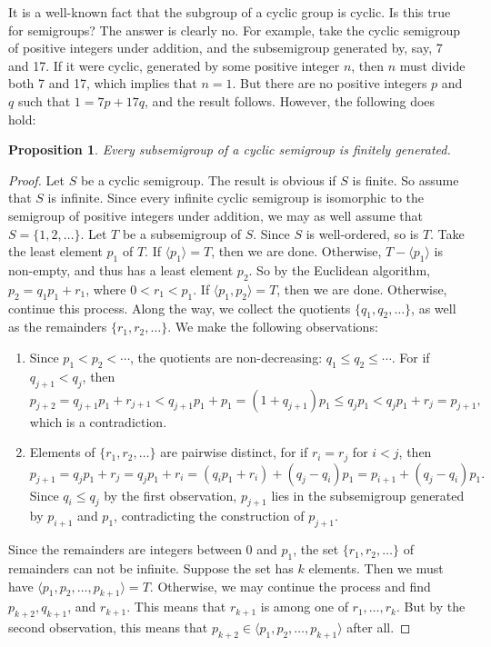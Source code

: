 \documentclass[12pt]{article}
\newtheorem{prop}{Proposition}
\begin{document}
It is a well-known fact that the subgroup of a cyclic group is cyclic.  Is this true for semigroups?  The answer is clearly no.  For example, take the cyclic semigroup of positive integers under addition, and the subsemigroup generated by, say, 7 and 17.  If it were cyclic, generated by some positive integer $n$, then $n$ must divide both 7 and 17, which implies that $n=1$.  But there are no positive integers $p$ and $q$ such that $1=7p+17q$, and the result follows.  However, the following does hold:

\begin{prop} Every subsemigroup of a cyclic semigroup is finitely generated. \end{prop}
\begin{proof}  Let $S$ be a cyclic semigroup.  The result is obvious if $S$ is finite.  So assume that $S$ is infinite.  Since every infinite cyclic semigroup is isomorphic to the semigroup of positive integers under addition, we may as well assume that $S=\lbrace 1,2,\ldots\rbrace$.  Let $T$ be a subsemigroup of $S$.  Since $S$ is well-ordered, so is $T$.  Take the least element $p_1$ of $T$.  If $\langle p_1 \rangle = T$, then we are done.  Otherwise, $T-\langle p_1\rangle$ is non-empty, and thus has a least element $p_2$.  So by the Euclidean algorithm, $p_2 = q_1 p_1 + r_1$, where $0 < r_1 < p_1$.  If $\langle p_1, p_2 \rangle = T$, then we are done.  Otherwise, continue this process.  Along the way, we collect the quotients $\lbrace q_1, q_2, \ldots \rbrace$, as well as the remainders $\lbrace r_1, r_2, \ldots \rbrace$.  We make the following observations:
\begin{enumerate}
\item Since $p_1 < p_2 < \cdots $, the quotients are non-decreasing: $q_1 \le q_2 \le \cdots $.  For if $q_{j+1} < q_j$, then $$p_{j+2} = q_{j+1}p_1 + r_{j+1} < q_{j+1}p_1 + p_1 = (1 + q_{j+1})p_1 \le q_j p_1 < q_j p_1 + r_j = p_{j+1},$$ which is a contradiction.  
\item Elements of $\lbrace r_1, r_2, \ldots \rbrace$ are pairwise distinct, for if $r_i = r_j$ for $i< j$, then $$p_{j+1} = q_j p_1 + r_j = q_j p_1 + r_i = (q_i p_1 + r_i) + (q_j-q_i)p_1 = p_{i+1} + (q_j-q_i)p_1.$$  Since $q_i\le q_j$ by the first observation, $p_{j+1}$ lies in the subsemigroup generated by $p_{i+1}$ and $p_1$, contradicting the construction of $p_{j+1}$.
\end{enumerate}
Since the remainders are integers between $0$ and $p_1$, the set $\lbrace r_1, r_2, \ldots \rbrace$ of remainders can not be infinite.  Suppose the set has $k$ elements.  Then we must have $\langle p_1 , p_2 , \ldots, p_{k+1} \rangle = T$.  Otherwise, we may continue the process and find $p_{k+2},q_{k+1}$, and $r_{k+1}$.  This means that $r_{k+1}$ is among one of $r_1,\ldots, r_k$.  But by the second observation, this means that $p_{k+2}\in \langle p_1 , p_2 , \ldots, p_{k+1} \rangle$ after all.
\end{proof}
\end{document}
